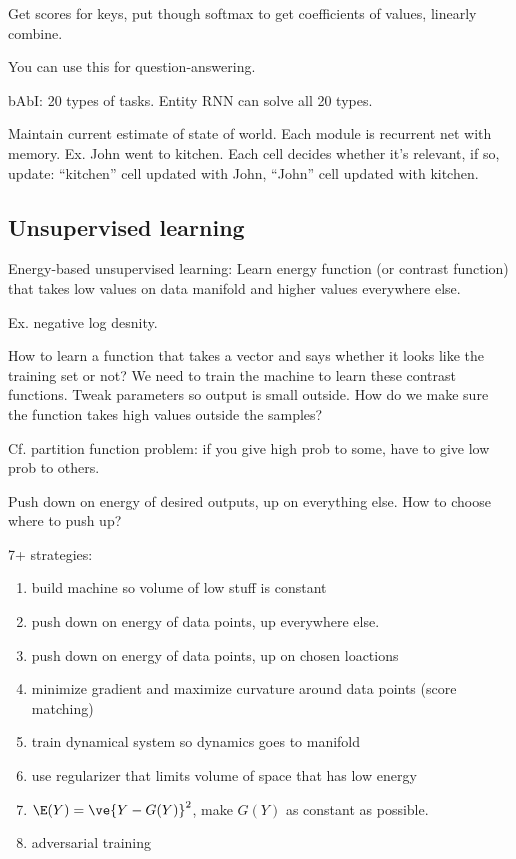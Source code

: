 Get scores for keys, put though softmax to get coefficients of values, linearly combine.

You can use this for question-answering.

bAbI: 20 types of tasks. Entity RNN can solve all 20 types.

Maintain current estimate of state of world. 
Each module is recurrent net with memory.
Ex. John went to kitchen. Each cell decides whether it's relevant, if so, update: ``kitchen'' cell updated with John, ``John'' cell updated with kitchen.


\subsection{Unsupervised learning}

Energy-based unsupervised learning: Learn energy function (or contrast function) that takes low values on data manifold and higher values everywhere else.

Ex. negative log desnity.

How to learn a function that takes a vector and says whether it looks like the training set or not?
We need to train the machine to learn these contrast functions. Tweak parameters so output is small outside. How do we make sure the function takes high values outside the samples? 

Cf. partition function problem: if you give high prob to some, have to give low prob to others.

Push down on energy of desired outputs, up on everything else. How to choose where to push up?

7+ strategies:
\begin{enumerate}
\item
build machine so volume of low stuff is constant
\item
push down on energy of data points, up  everywhere else.
\item
push down on energy of data points, up on chosen loactions
\item
minimize gradient and maximize curvature around data points (score matching)
\item
train dynamical system so dynamics goes to manifold
\item
use regularizer that limits volume of space that has low energy
\item
$\E(Y)=\ve{Y-G(Y)}^2$, make $G(Y)$ as constant as possible.
\item
adversarial training
\end{enumerate}

